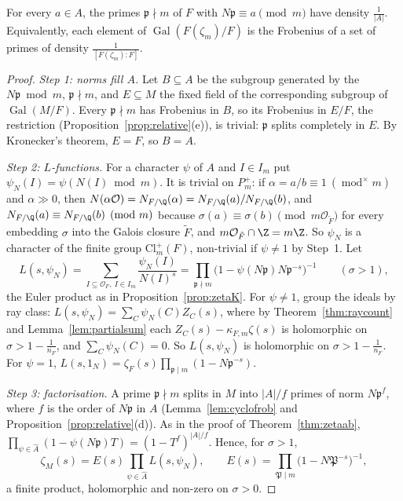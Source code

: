 \begin{theorem}\label{thm:dirichletF}
For every $a\in A$, the primes $\mathfrak p\nmid m$ of $F$ with $N\mathfrak p\equiv a\pmod m$ have density $\frac1{|A|}$. Equivalently, each element of
$\operatorname{Gal}(F(\zeta_m)/F)$ is the Frobenius of a set of primes of density $\frac1{[F(\zeta_m):F]}$.
\end{theorem}
\begin{proof}
\emph{Step 1: norms fill $A$.} Let $B\subseteq A$ be the subgroup generated by the $N\mathfrak p\bmod m$, $\mathfrak p\nmid m$, and $E\subseteq M$
the fixed field of the corresponding subgroup of $\operatorname{Gal}(M/F)$. Every $\mathfrak p\nmid m$ has Frobenius in $B$, so its Frobenius in
$E/F$, the restriction (Proposition~\ref{prop:relative}(e)), is trivial: $\mathfrak p$ splits completely in $E$. By Kronecker's theorem, $E=F$, so
$B=A$.

\emph{Step 2: $L$-functions.} For a character $\psi$ of $A$ and $I\in I_m$ put $\psi_N(I)=\psi(N(I)\bmod m)$. It is trivial on $P_m^+$: if
$\alpha=a/b\equiv1\ (\operatorname{mod}^\times m)$ and $\alpha\gg0$, then $N(\alpha\mathcal O)=N_{F/\Q}(\alpha)=N_{F/\Q}(a)/N_{F/\Q}(b)$, and $N_{F/\Q}(a)\equiv N_{F/\Q}(b)
\pmod m$ because $\sigma(a)\equiv\sigma(b)\pmod{m\mathcal O_{\tilde F}}$ for every embedding $\sigma$ into the Galois closure $\tilde F$, and
$m\mathcal O_{\tilde F}\cap\Z=m\Z$. So $\psi_N$ is a character of the finite group $\mathrm{Cl}_m^+(F)$, non-trivial if $\psi\ne1$ by Step~1. Let
\[
L(s,\psi_N)=\sum_{I\subseteq\mathcal O_F,\ I\in I_m}\frac{\psi_N(I)}{N(I)^s}=\prod_{\mathfrak p\nmid m}\bigl(1-\psi(N\mathfrak p)N\mathfrak p^{-s}\bigr)^{-1}
\qquad(\sigma>1),
\]
the Euler product as in Proposition~\ref{prop:zetaK}. For $\psi\ne1$, group the ideals by ray class: $L(s,\psi_N)=\sum_C\psi_N(C)Z_C(s)$, where
by Theorem~\ref{thm:raycount} and Lemma~\ref{lem:partialsum} each $Z_C(s)-\kappa_{F,m}\zeta(s)$ is holomorphic on $\sigma>1-\frac1{n_F}$, and
$\sum_C\psi_N(C)=0$. So $L(s,\psi_N)$ is holomorphic on $\sigma>1-\frac1{n_F}$. For $\psi=1$, $L(s,1_N)=\zeta_F(s)\prod_{\mathfrak p\mid m}(1-
N\mathfrak p^{-s})$.

\emph{Step 3: factorisation.} A prime $\mathfrak p\nmid m$ splits in $M$ into $|A|/f$ primes of norm $N\mathfrak p^f$, where $f$ is the order of
$N\mathfrak p$ in $A$ (Lemma~\ref{lem:cyclofrob} and Proposition~\ref{prop:relative}(d)). As in the proof of Theorem~\ref{thm:zetaab},
$\prod_{\psi\in\widehat A}(1-\psi(N\mathfrak p)T)=(1-T^f)^{|A|/f}$. Hence, for $\sigma>1$,
\[
\zeta_M(s)=E(s)\prod_{\psi\in\widehat A}L(s,\psi_N),\qquad E(s)=\prod_{\mathfrak P\mid m}\bigl(1-N\mathfrak P^{-s}\bigr)^{-1},
\]
a finite product, holomorphic and non-zero on $\sigma>0$.


\end{proof}

